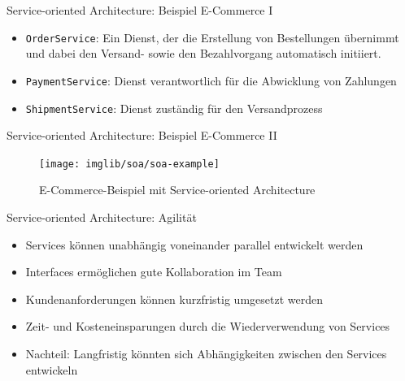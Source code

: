 \begin{frame}{Service-oriented Architecture: Beispiel E-Commerce I}
  \begin{itemize}
    \item \texttt{OrderService}: Ein Dienst, der die Erstellung von Bestellungen übernimmt und dabei den Versand- sowie den Bezahlvorgang automatisch initiiert.
    \item \texttt{PaymentService}: Dienst verantwortlich für die Abwicklung von Zahlungen
    \item \texttt{ShipmentService}: Dienst zuständig für den Versandprozess
  \end{itemize}
\end{frame}

\begin{frame}{Service-oriented Architecture: Beispiel E-Commerce II}
  \begin{figure}[!h]
    \centering
    \texttt{[image: imglib/soa/soa-example]}
    \caption{E-Commerce-Beispiel mit Service-oriented Architecture}
    \label{fig:soaecommerce}
  \end{figure}
\end{frame}

\begin{frame}{Service-oriented Architecture: Agilität}
  \begin{itemize}
    \item Services können unabhängig voneinander parallel entwickelt werden
    \item Interfaces ermöglichen gute Kollaboration im Team
    \item Kundenanforderungen können kurzfristig umgesetzt werden
    \item Zeit- und Kosteneinsparungen durch die Wiederverwendung von Services
    \item Nachteil: Langfristig könnten sich Abhängigkeiten zwischen den Services entwickeln
    \end{itemize}
\end{frame}

